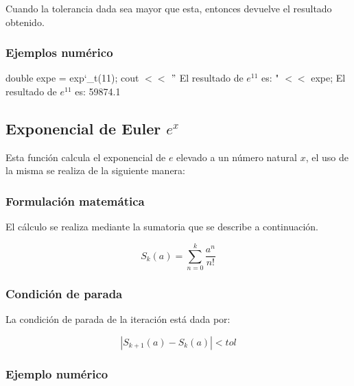\documentclass[10pt,a4paper]{article}
\begin{document}
	Cuando la tolerancia dada sea mayor que esta, entonces devuelve el resultado obtenido.
	
	\subsubsection{Ejemplos numérico}

	double expe = exp\char`_t(11); \newline
	cout $<<$ $"$ El resultado de $e^{11}$ es: " $<<$ expe; \newline
	El resultado de $e^{11}$ es: 59874.1 \newline
	
	\subsection{Exponencial de Euler $e^{x}$}
	
	Esta función calcula el exponencial de $e$ elevado a un número natural $x$, el uso de la misma se realiza de la siguiente manera:
	
	\begin{center}
	\end{center}
	
	\subsubsection{Formulación matemática}
	
	El cálculo se realiza mediante la sumatoria que se describe a continuación.
	
	\begin{equation}\label{key4}
		S_{k}(a) = \sum_{n=0}^{k}\frac{a^{n}}{n!}
	\end{equation}
	
	\subsubsection{Condición de parada}
	
	La condición de parada de la iteración está dada por: 
	
	\begin{equation}\label{key5}
		\left\lvert S_{k+1}(a) - S_{k}(a) \right\lvert < tol
	\end{equation}
	
	\subsubsection{Ejemplo numérico}
\end{document}
